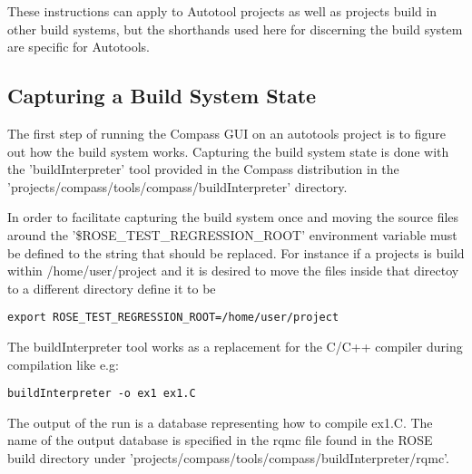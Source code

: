These instructions can apply to Autotool projects as well as projects build in other build 
systems, but the shorthands used here for discerning the build system are specific for Autotools.


\subsection{Capturing a Build System State}

The first step of running the Compass GUI on an autotools project is to figure out how the build system
works. Capturing the build system state is done with the 'buildInterpreter' tool provided in the Compass
distribution in the 'projects/compass/tools/compass/buildInterpreter' directory. 

In order to facilitate capturing the build system once and moving the source files around the '\$ROSE\_TEST\_REGRESSION_ROOT' environment variable must be defined to the string that should be replaced. For instance if a
projects is build within /home/user/project and it is desired to move the files inside that directoy to a
different directory define it to be
\begin{verbatim}
export ROSE_TEST_REGRESSION_ROOT=/home/user/project
\end{verbatim}

The buildInterpreter tool works as a replacement for the C/C++ compiler during compilation like e.g:
\begin{verbatim}
buildInterpreter -o ex1 ex1.C
\end{verbatim}
The output of the run is a database representing how to compile ex1.C. The name of the output database is specified
in the rqmc file found in the ROSE build directory under 'projects/compass/tools/compass/buildInterpreter/rqmc'.





